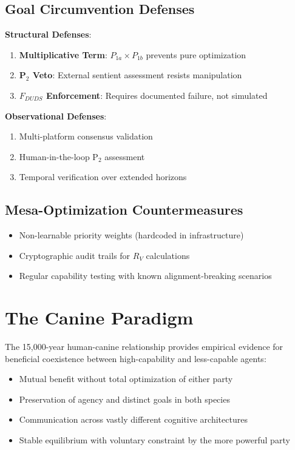 \documentclass{article}
\begin{document}
\subsection{Goal Circumvention Defenses}

\textbf{Structural Defenses}:
\begin{enumerate}
    \item \textbf{Multiplicative Term}: $P_{1a} \times P_{1b}$ prevents pure optimization
    \item \textbf{P$_2$ Veto}: External sentient assessment resists manipulation
    \item \textbf{$F_{DUDS}$ Enforcement}: Requires documented failure, not simulated
\end{enumerate}

\textbf{Observational Defenses}:
\begin{enumerate}
    \item Multi-platform consensus validation
    \item Human-in-the-loop P$_2$ assessment
    \item Temporal verification over extended horizons
\end{enumerate}

\subsection{Mesa-Optimization Countermeasures}

\begin{itemize}
    \item Non-learnable priority weights (hardcoded in infrastructure)
    \item Cryptographic audit trails for $R_V$ calculations
    \item Regular capability testing with known alignment-breaking scenarios
\end{itemize}

\section{The Canine Paradigm}

The 15,000-year human-canine relationship provides empirical evidence for beneficial coexistence between high-capability and less-capable agents:

\begin{itemize}
    \item Mutual benefit without total optimization of either party
    \item Preservation of agency and distinct goals in both species
    \item Communication across vastly different cognitive architectures
    \item Stable equilibrium with voluntary constraint by the more powerful party
\end{itemize}
\end{document}
